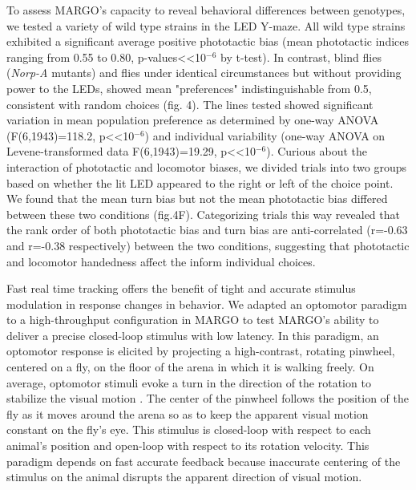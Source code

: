 \documentclass[10pt]{article}
\begin{document}
\begin{multicols}{2}
To assess MARGO's capacity to reveal behavioral differences between genotypes, we tested a variety of wild type strains in the LED Y-maze. All wild type strains exhibited a significant average positive phototactic bias (mean phototactic indices ranging from 0.55 to 0.80, p-values<<10$^{-6}$ by t-test). In contrast, blind flies (\emph{Norp-A} mutants) and flies under identical circumstances but without providing power to the LEDs, showed mean "preferences" indistinguishable from 0.5, consistent with random choices (fig. 4). The lines tested showed significant variation in mean population preference as determined by one-way ANOVA (F(6,1943)=118.2, p<<10$^{-6}$) and individual variability (one-way ANOVA on Levene-transformed data F(6,1943)=19.29, p<<10$^{-6}$). Curious about the interaction of phototactic and locomotor biases, we divided trials into two groups based on whether the lit LED appeared to the right or left of the choice point. We found that the mean turn bias but not the mean phototactic bias differed between these two conditions (fig.4F). Categorizing trials this way revealed that the rank order of both phototactic bias and turn bias are anti-correlated (r=-0.63 and r=-0.38 respectively) between the two conditions, suggesting that phototactic and locomotor handedness affect the inform individual choices. 

Fast real time tracking offers the benefit of tight and accurate stimulus modulation in response changes in behavior. We adapted an optomotor paradigm \cite{Fujiwara_A_2017} to a high-throughput configuration in MARGO  to test MARGO's ability to deliver a precise closed-loop stimulus with low latency. In this paradigm, an optomotor response is elicited by projecting a high-contrast, rotating pinwheel, centered on a fly, on the floor of the arena in which it is walking freely. On average, optomotor stimuli evoke a turn in the direction of the rotation to stabilize the visual motion \cite{Gtz_Visual_1973}. The center of the pinwheel follows the position of the fly as it moves around the arena so as to keep the apparent visual motion constant on the fly's eye. This stimulus is closed-loop with respect to each animal's position and open-loop with respect to its rotation velocity. This paradigm depends on fast accurate feedback because inaccurate centering of the stimulus on the animal disrupts the apparent direction of visual motion.


\end{multicols}
\end{document}
